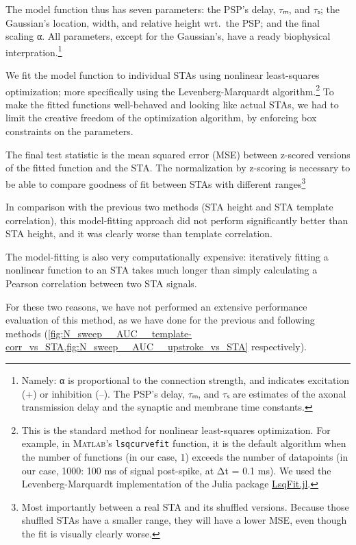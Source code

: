 The model function thus has seven parameters: the PSP's delay, $τₘ$, and $τₛ$; the Gaussian's location, width, and relative height wrt.~the PSP; and the final scaling α.
All parameters, except for the Gaussian's, have a ready biophysical interpration.\footnote
    {Namely: α is proportional to the connection strength, and indicates excitation (+) or inhibition (–). The PSP's delay, $τₘ$, and $τₛ$ are estimates of the axonal transmission delay and the synaptic and membrane time constants.}

We fit the model function to individual STAs using nonlinear least-squares optimization; more specifically using the Levenberg-Marquardt algorithm.\footnote{
    This is the standard method for nonlinear least-squares optimization. For example, in \textsc{Matlab}'s \texttt{lsqcurvefit} function,  it is the default algorithm when the number of functions (in our case, 1) exceeds the number of datapoints (in our case, 1000:  100 ms of signal post-spike, at Δt = 0.1 ms).\newline
    We used the Levenberg-Marquardt implementation of the Julia package \href{https://github.com/JuliaNLSolvers/LsqFit.jl}{LsqFit.jl}.
}
%
To make the fitted functions well-behaved and looking like actual STAs, we had to limit the creative freedom of the optimization algorithm, by enforcing box constraints on the parameters.

The final test statistic is the mean squared error (MSE) between z-scored versions of the fitted function and the STA. The normalization by z-scoring is necessary to be able to compare goodness of fit between STAs with different ranges\footnote{
    Most importantly between a real STA and its shuffled versions.
    Because those shuffled STAs have a smaller range, they will have a lower MSE, even though the fit is visually clearly worse.
}

In comparison with the previous two methods (STA height and STA template correlation), this model-fitting approach did not perform significantly better than STA height, and it was clearly worse than template correlation.

The model-fitting is also very computationally expensive: iteratively fitting a nonlinear function to an STA takes much longer than simply calculating a Pearson correlation between two STA signals.

For these two reasons, we have not performed an extensive performance evaluation of this method, as we have done for the previous and following methods (\cref{fig:N_sweep__AUC__template-corr_vs_STA,fig:N_sweep__AUC__upstroke_vs_STA} respectively).

